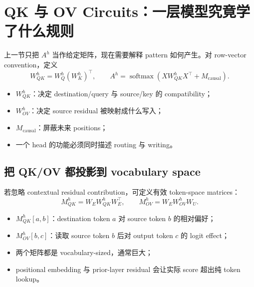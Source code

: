 \section{QK 与 OV Circuits：一层模型究竟学了什么规则}

上一节只把 $A^h$ 当作给定矩阵，现在需要解释 pattern 如何产生。对 row-vector convention，定义
\[
W_{QK}^h=W_Q^h(W_K^h)^{\top},
\qquad
A^h=\operatorname{softmax}\!\left(XW_{QK}^hX^{\top}+M_{\mathrm{causal}}\right).
\]

\begin{itemize}
  \item $W_{QK}^h$：决定 destination/query 与 source/key 的 compatibility；
  \item $W_{OV}^h$：决定 source residual 被映射成什么写入；
  \item $M_{\mathrm{causal}}$：屏蔽未来 positions；
  \item 一个 head 的功能必须同时描述 routing 与 writing。
\end{itemize}


\subsection{把 QK/OV 都投影到 vocabulary space}

若忽略 contextual residual contribution，可定义有效 token-space matrices：
\[
M_{QK}^h=W_EW_{QK}^hW_E^{\top},
\qquad
M_{OV}^h=W_EW_{OV}^hW_U.
\]

\begin{itemize}
  \item $M_{QK}^h[a,b]$：destination token $a$ 对 source token $b$ 的相对偏好；
  \item $M_{OV}^h[b,c]$：读取 source token $b$ 后对 output token $c$ 的 logit effect；
  \item 两个矩阵都是 vocabulary-sized，通常巨大；
  \item positional embedding 与 prior-layer residual 会让实际 score 超出纯 token lookup。
\end{itemize}



